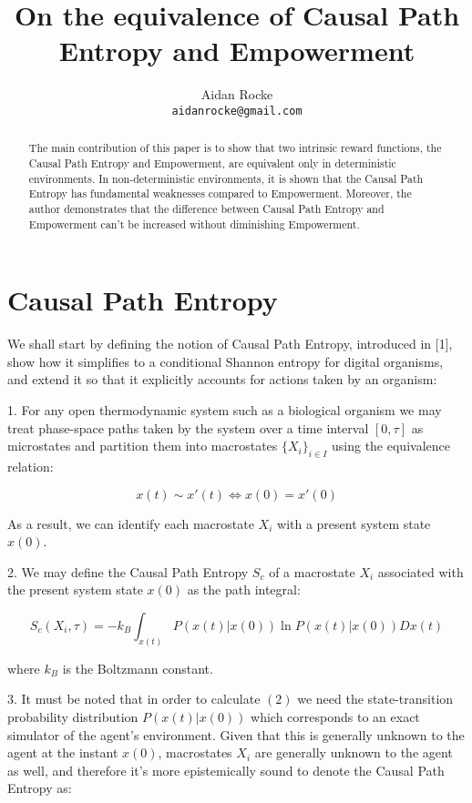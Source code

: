 \documentclass{article}
\title{On the equivalence of Causal Path Entropy and Empowerment}
\author{%
  Aidan Rocke\\
  \texttt{aidanrocke@gmail.com} \\
}
\begin{document}

\maketitle

\begin{abstract}
   The main contribution of this paper is to show that two intrinsic reward functions, the Causal Path Entropy and Empowerment, are equivalent only in deterministic environments. In non-deterministic environments, it is shown that the Causal Path Entropy has fundamental weaknesses compared to Empowerment. Moreover, the author demonstrates that the difference between Causal Path Entropy and Empowerment can't be increased without diminishing Empowerment. 
\end{abstract}

\section{Causal Path Entropy}

We shall start by defining the notion of Causal Path Entropy, introduced in [1], show how it simplifies to a conditional Shannon entropy for digital organisms, and extend it so that it explicitly accounts for actions taken by an organism: 

1. For any open thermodynamic system such as a biological organism we may treat phase-space paths taken by the system over a time interval $[0,\tau]$ as microstates and partition them into macrostates $\{X_i\}_{i\in I}$ using the equivalence relation:

\begin{equation}
x(t) \sim x'(t) \iff x(0)=x'(0)	
\end{equation}

As a result, we can identify each macrostate $X_i$ with a present system state $x(0)$.

2. We may define the Causal Path Entropy $S_c$ of a macrostate $X_i$ associated with the present system state $x(0)$ as the path integral:

\begin{equation}
S_c(X_i,\tau)=-k_B \int_{x(t)} P(x(t)|x(0))\ln P(x(t)|x(0)) Dx(t)
\end{equation}

where $k_B$ is the Boltzmann constant. 

3. It must be noted that in order to calculate $(2)$ we need the state-transition probability distribution $P(x(t)|x(0))$ which corresponds to an exact simulator of the agent's environment. Given that this is generally unknown to the agent at the instant $x(0)$, macrostates $X_i$ are generally unknown to the agent as well, and therefore it's more epistemically sound to denote the Causal Path Entropy as:
\end{document}
